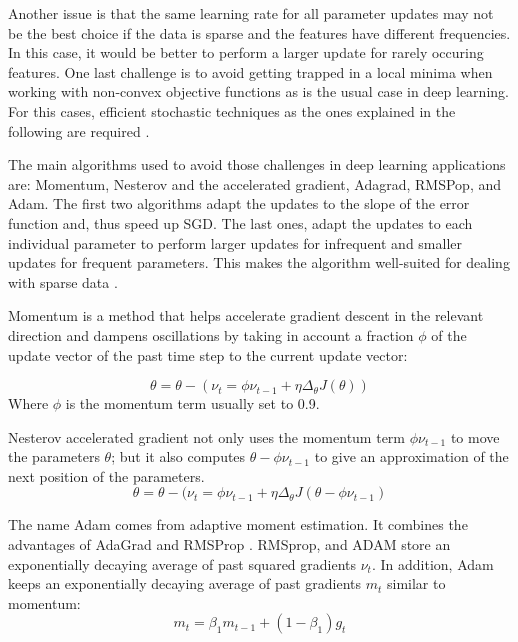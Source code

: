 Another issue is that the same learning rate for all parameter updates may not be the best choice if the data is sparse and the features have different frequencies. In this case, it would be better to perform a larger update for rarely occuring features. One last challenge is to avoid getting trapped in a local minima when working with non-convex objective functions as is the usual case in deep learning. For this cases, efficient stochastic techniques as the ones explained in the following are required \cite{ruder2016overview}.

The main algorithms used to avoid those challenges in deep learning applications are: Momentum, Nesterov and the accelerated gradient, Adagrad, RMSPop, and Adam. The first two algorithms adapt the updates to the slope of the error function and, thus speed up SGD. The last ones, adapt the updates to each individual parameter to perform larger updates for infrequent and smaller updates for frequent parameters. This makes the algorithm well-suited for dealing with sparse data \cite{ruder2016overview}.

Momentum \cite{qian1999momentum} is a method that helps accelerate gradient descent in the relevant direction and dampens oscillations by taking in account a fraction $\phi$ of the update vector of the past time step to the current update vector:

\begin{equation}
\theta=\theta-(\nu_t=\phi \nu_{t-1} + \eta \Delta_\theta J(\theta))
\end{equation}
Where $\phi$ is the momentum term usually set to 0.9.


Nesterov accelerated gradient \cite{nesterov1983method} not only uses the momentum term $\phi \nu_{t-1}$  to move the parameters $\theta$; but it also computes $\theta - \phi \nu_{t-1}$ to give an approximation of the next position of the parameters.  
\begin{equation}
\theta=\theta-(\nu_t = \phi \nu_{t-1} + \eta \Delta_\theta J(\theta - \phi \nu_{t-1})
\end{equation}
  
The name Adam comes from adaptive moment estimation. It combines the advantages of AdaGrad and RMSProp \cite{kingma2014adam}. RMSprop, and ADAM  store an exponentially decaying average of past squared gradients $\nu_t$. In addition, Adam keeps an exponentially decaying average of past gradients $m_t$ similar to momentum:
\begin{equation}
m_t=\beta_1 m_{t-1} + (1-\beta_1)g_t
\end{equation}

